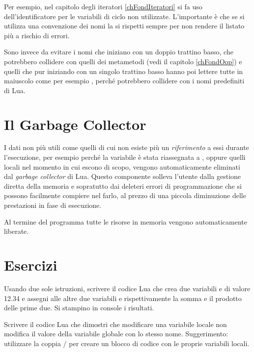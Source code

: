 Per esempio, nel capitolo degli iteratori \ref{chFondIteratori} si fa uso
dell'identificatore \key{\_} per le variabili di ciclo non utilizzate.
L'importante è che se si utilizza una convenzione dei nomi la si rispetti sempre
per non rendere il listato più a rischio di errori.

Sono invece da evitare i nomi che iniziano con un doppio trattino basso, che
potrebbero collidere con quelli dei metametodi (vedi il capitolo
\ref{chFondOop}) e quelli che pur iniziando con un singolo trattino basso hanno
poi lettere tutte in maiuscolo come per esempio
, perché potrebbero collidere con i nomi
predefiniti di Lua.


\section{Il Garbage Collector}

I dati non più utili come quelli di cui non esiste più un \emph{riferimento} a
essi durante l'esecuzione, per esempio perché la variabile è stata riassegnata a
, oppure quelli locali nel momento in cui escono di scopo, vengono
automaticamente eliminati dal \emph{garbage collector} di Lua. Questo componente
solleva l'utente dalla gestione diretta della memoria e sopratutto dai deleteri
errori di programmazione che si possono facilmente compiere nel farlo, al prezzo
di una piccola diminuzione delle prestazioni in fase di esecuzione.

Al termine del programma tutte le risorse in memoria vengono automaticamente
liberate.

\section{Esercizi}

\begin{Exercise}[label=fond-01]
Usando due sole istruzioni, scrivere il codice Lua che crea due variabili
 e  di valore 12.34 e assegni alle altre due variabili  e
 rispettivamente la somma e il prodotto delle prime due. Si stampino
in console i risultati.
\end{Exercise}

\begin{Exercise}[label=fond-02]
Scrivere il codice Lua che dimostri che modificare una variabile locale non
modifica il valore della variabile globale con lo stesso nome. Suggerimento:
utilizzare la coppia / per creare un blocco di codice con le
proprie variabili locali.
\end{Exercise}

